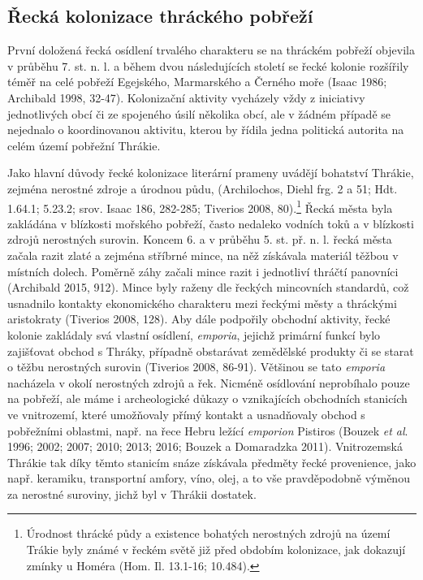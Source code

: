 \subsection[řecká-kolonizace-thráckého-pobřeží]{Řecká kolonizace thráckého pobřeží}

První doložená řecká osídlení trvalého charakteru se na thráckém pobřeží objevila v průběhu 7. st. n. l. a během dvou následujících století se řecké kolonie rozšířily téměř na celé pobřeží Egejského, Marmarského a Černého moře (Isaac 1986; Archibald 1998, 32-47). Kolonizační aktivity vycházely vždy z iniciativy jednotlivých obcí či ze spojeného úsilí několika obcí, ale v žádném případě se nejednalo o koordinovanou aktivitu, kterou by řídila jedna politická autorita na celém území pobřežní Thrákie.

Jako hlavní důvody řecké kolonizace literární prameny uvádějí bohatství Thrákie, zejména nerostné zdroje a úrodnou půdu, (Archilochos, Diehl frg. 2 a 51; Hdt. 1.64.1; 5.23.2; srov. Isaac 186, 282-285; Tiverios 2008, 80).\footnote{Úrodnost thrácké půdy a existence bohatých nerostných zdrojů na území Trákie byly známé v řeckém světě již před obdobím kolonizace, jak dokazují zmínky u Homéra (Hom. Il. 13.1-16; 10.484).} Řecká města byla zakládána v blízkosti mořského pobřeží, často nedaleko vodních toků a v blízkosti zdrojů nerostných surovin. Koncem 6. a v průběhu 5. st. př. n. l. řecká města začala razit zlaté a zejména stříbrné mince, na něž získávala materiál těžbou v místních dolech. Poměrně záhy začali mince razit i jednotliví thráčtí panovníci (Archibald 2015, 912). Mince byly raženy dle řeckých mincovních standardů, což usnadnilo kontakty ekonomického charakteru mezi řeckými městy a thráckými aristokraty (Tiverios 2008, 128). Aby dále podpořily obchodní aktivity, řecké kolonie zakládaly svá vlastní osídlení, {\em emporia}, jejichž primární funkcí bylo zajišťovat obchod s Thráky, případně obstarávat zemědělské produkty či se starat o těžbu nerostných surovin (Tiverios 2008, 86-91). Většinou se tato {\em emporia} nacházela v okolí nerostných zdrojů a řek. Nicméně osídlování neprobíhalo pouze na pobřeží, ale máme i archeologické důkazy o vznikajících obchodních stanicích ve vnitrozemí, které umožňovaly přímý kontakt a usnadňovaly obchod s pobřežními oblastmi, např. na řece Hebru ležící {\em emporion} Pistiros (Bouzek {\em et al}. 1996; 2002; 2007; 2010; 2013; 2016; Bouzek a Domaradzka 2011). Vnitrozemská Thrákie tak díky těmto stanicím snáze získávala předměty řecké provenience, jako např. keramiku, transportní amfory, víno, olej, a to vše pravděpodobně výměnou za nerostné suroviny, jichž byl v Thrákii dostatek.

